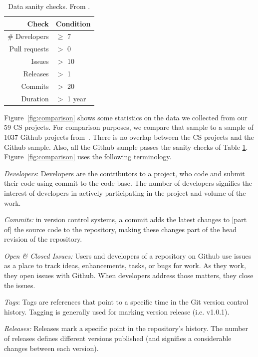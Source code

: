 \documentclass[sigconf]{acmart}
\begin{document}
\begin{table}[!t]
\caption{Data sanity checks. From \cite{Kalliamvakou:2014}.}\label{tbl:sanity}
\small
 
 \begin{tabular}{r|l}
 Check   & Condition    \\\hline
 \# Developers & $\geq$ 7 \\
 Pull requests  & $>$ 0 \\
Issues & $>$ 10 \\
Releases &  $>$ 1 \\
Commits & $>$ 20 \\
Duration  & $>$ 1 year 
\end{tabular}%
 
\end{table}
Figure~\ref{fig:comparison} shows some statistics on the data we collected from our 59 CS projects. For comparison purposes, we compare that sample to 
a sample of 1037 Github projects from~\cite{Majumder19}.
There is no overlap between the CS projects and the Github sample. Also, all the Github
sample passes the sanity checks of Table \ref{tbl:sanity}. Figure~\ref{fig:comparison} uses the following terminology.


\textit{Developers}: Developers are the contributors to a project, who code and submit their code using commit to the code base. The number of developers signifies the interest of developers in actively participating in the project and volume of the work.
  
  

\textit{Commits:} in version control systems, a commit adds the latest changes to [part of] the source code to the repository, making these changes part of the head revision of the repository. 

\textit{Open \& Closed Issues:} Users and developers of a repository on Github use issues as a place to track ideas, enhancements, tasks, or bugs for work. As they work, they open issues with Github. When developers address those matters, they close the issues.

\textit{Tags}: Tags are references that point to a specific time in the Git version control history. Tagging is generally used for marking version release (i.e. v1.0.1).


\textit{Releases:} Releases mark a specific point in the repository’s history. The number of releases defines different versions published (and  signifies a considerable  changes  between each version).
\end{document}
